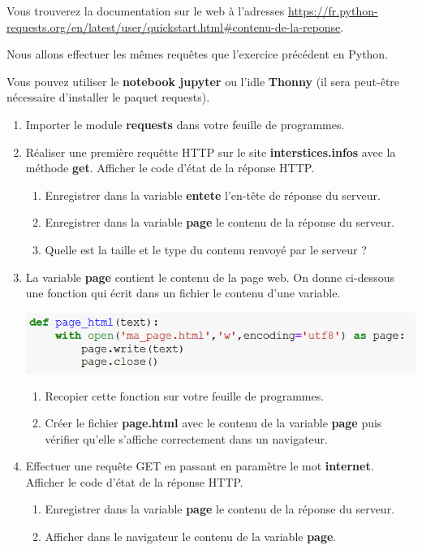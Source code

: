\documentclass[11pt,a4paper]{article}
\begin{document}
Vous trouverez la documentation sur le web à l'adresses \url{https://fr.python-requests.org/en/latest/user/quickstart.html#contenu-de-la-reponse}.

Nous allons effectuer les mêmes requêtes que l'exercice précédent en Python.

Vous pouvez utiliser le \textbf{notebook jupyter} ou l'idle \textbf{Thonny} (il sera peut-être nécessaire d'installer le paquet requests).

\begin{enumerate}
\item Importer le module \textbf{requests} dans votre feuille de programmes.
\item Réaliser une première requêtte HTTP sur le site \textbf{interstices.infos} avec la méthode \textbf{get}. Afficher le code d'état de la réponse HTTP.
\begin{enumerate}
\item Enregistrer dans la variable \textbf{entete} l'en-tête de réponse du serveur.
\item Enregistrer dans la variable \textbf{page} le contenu de la réponse du serveur.
\item Quelle est la taille et le type du contenu renvoyé par le serveur ?
\end{enumerate}

\item La variable \textbf{page} contient le contenu de la page web. On donne ci-dessous une fonction qui écrit dans un fichier le contenu d'une variable.

\begin{center}
\includegraphics[scale=0.7]{img/python-open.png}
\end{center}
\begin{enumerate}
\item Recopier cette fonction sur votre feuille de programmes.
\item Créer le fichier \textbf{page.html} avec le contenu de la variable \textbf{page} puis vérifier qu'elle s'affiche correctement dans un navigateur.
\end{enumerate}


\item Effectuer une requête GET en passant en paramètre le mot \textbf{internet}. Afficher le code d'état de la réponse HTTP.
\begin{enumerate}
\item Enregistrer dans la variable \textbf{page} le contenu de la réponse du serveur.
\item Afficher dans le navigateur le contenu de la variable \textbf{page}.
\end{enumerate}



\end{enumerate}
\end{document}

